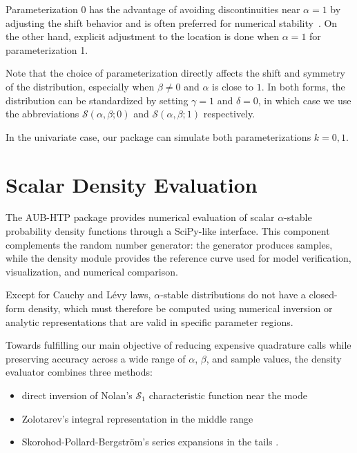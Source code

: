 Parameterization 0 has the advantage of avoiding discontinuities near $\alpha = 1$ by adjusting the shift behavior and is often preferred for numerical stability~\cite{NolanJohnP2020USDM}.
On the other hand, explicit adjustment to the location is done when $\alpha = 1$ for parameterization 1.


Note that the choice of parameterization directly affects the shift and symmetry of the distribution, especially when $\beta \neq 0$ and $\alpha$ is close to $1$. In both forms, the distribution can be standardized by setting $\gamma = 1$ and $\delta = 0$, in which case we use the abbreviations $\mathcal{S}(\alpha, \beta; 0)$ and $\mathcal{S}(\alpha, \beta; 1)$ respectively.

In the univariate case, our package can simulate both parameterizations $k=0,1$.


\section{Scalar Density Evaluation}

The AUB-HTP package provides numerical evaluation of scalar $\alpha$-stable probability density functions through a SciPy-like interface. This component complements the random number generator: the generator produces samples, while the density module provides the reference curve used for model verification, visualization, and numerical comparison.

Except for  Cauchy and L\'evy laws, $\alpha$-stable distributions do not have a closed-form density, which must therefore be computed using numerical inversion or analytic representations that are valid in specific parameter regions.



Towards fulfilling our main objective of reducing expensive quadrature calls while preserving accuracy across a wide range of $\alpha$, $\beta$, and sample values, the density evaluator combines three methods:
\begin{itemize}
\item[(a)] direct inversion of Nolan's $\mathcal{S}_1$ characteristic function near the mode \cite{NolanJohnP2020USDM}
\item[(b)] Zolotarev's integral representation in the middle range \cite{Zolotarev1986}
\item[(c)] Skorohod-Pollard-Bergstr{\"o}m's series expansions in the tails \cite{sko2, Wintner1941CauchySingularities, Pollard1946LaplaceIntegral}.
\end{itemize}



